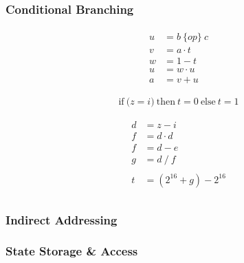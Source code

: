 \documentclass[Master.tex]{subfiles}
\begin{document}
\subsubsection{Conditional Branching}

\begin{gather*}
\begin{aligned}
u &= b\ \{op\}\ c \\
v &= a \cdot t \\
w &= 1 - t \\
u &= w \cdot u \\
a &= v + u
\end{aligned}
\end{gather*}

\begin{equation*}
\mathrm{if\ (}z = i\mathrm{)\ then\ } t = 0 \mathrm{\ else\ } t = 1
\end{equation*}

\begin{gather*}
\begin{aligned}
d &= z - i \\
f &= d \cdot d \\
f &= d - e \\
g &= d\ /\ f \\ \\
t &= (2^{16} + g) - 2^{16} \\
\end{aligned}
\end{gather*}

\subsubsection{Indirect Addressing}

\subsubsection{State Storage \& Access}
\end{document}
